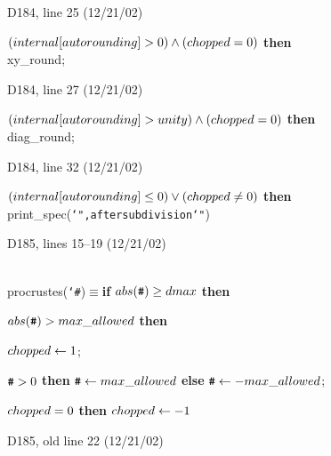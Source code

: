 {\bugonpage D184, line 25 (12/21/02)

\ninepoint\noindent
{} $(\\{internal}[\\{autorounding}]>0)\land(\\{chopped}=0)$
 {\bf then} \\{xy\_round};

\bugonpage D184, line 27 (12/21/02)

\ninepoint\noindent
{} $(\\{internal}[\\{autorounding}]>\\{unity})\land
 (\\{chopped}=0)$  {\bf then} \\{diag\_round};

\bugonpage D184, line 32 (12/21/02)

\ninepoint\noindent
{} $(\\{internal}[\\{autorounding}]\le0)\lor(\\{chopped}\ne0)$
 {\bf then} \\{print\_spec}({\tt\char`",\]after\]subdivision\char`"})

\bugonpage D185, lines 15--19 (12/21/02)

\ninepoint\noindent
{} \\{procrustes}({\tt\char`#})${}\equiv{}${\bf if\/}
  $\\{abs}(\.\#)\ge\\{dmax}$ {\bf then}\par\noindent
\qquad\qquad{} $\\{abs}(\.\#)>\\{max\_allowed}$ {\bf then}\par
\noindent\qquad\qquad{} $\\{chopped}\gets1$;\par\noindent
\qquad\qquad{} $\.\#>0$ {\bf then} $\.\#\gets\\{max\_allowed}$
  {\bf else} $\.\#\gets-\\{max\_allowed}$;\par\noindent
\qquad\qquad{}\par\noindent
\qquad\qquad{} $\\{chopped}=0$ {\bf then}
  $\\{chopped}\gets-1$

\bugonpage D185, old line 22 (12/21/02)

}
